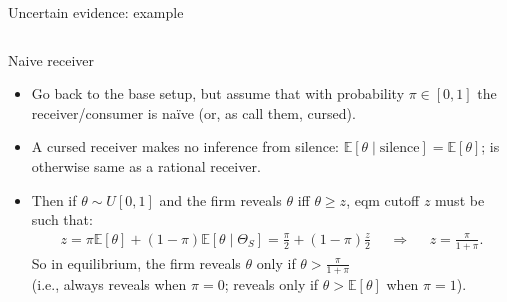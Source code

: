 \documentclass[english,10pt
,aspectratio=169
]{beamer}
\begin{document}
\begin{frame}{Uncertain evidence: example}
\begin{columns}
\begin{column}{0.4\linewidth}
	\end{column}
\end{columns}
\end{frame}


\begin{frame}{Naive receiver \citep{milgrom_relying_1986}}
\begin{itemize}
	\item Go back to the base setup, but assume that with probability $\pi \in [0,1]$ the receiver/consumer is \alert{na{\"i}ve} (or, as \cite{eyster_cursed_2005} call them, \alert{cursed}).
	
	\item A cursed receiver makes no inference from silence: $\mathbb{E}[\theta \mid \text{silence} ] = \mathbb{E}[\theta]$; is otherwise same as a rational receiver.
	
	\pause \bigskip 
	\item Then if $\theta \sim U[0,1]$ and the firm reveals $\theta$ iff $\theta \geq z$, eqm cutoff $z$ must be such that:
	\begin{align*}
		z = \pi \mathbb{E}[\theta] + (1-\pi) \mathbb{E}[\theta \mid \Theta_S] = \frac{\pi}{2} + (1-\pi)\frac{z}{2}
		&& \Rightarrow &&
		z = \frac{\pi}{1+\pi}.
	\end{align*}
	So in equilibrium, the firm reveals $\theta$ only if $\theta > \frac{\pi}{1+\pi}$ \\
	(i.e., always reveals when $\pi=0$; reveals only if $\theta>\mathbb{E}[\theta]$ when $\pi=1$).
\end{itemize}
\end{frame}
\end{document}
